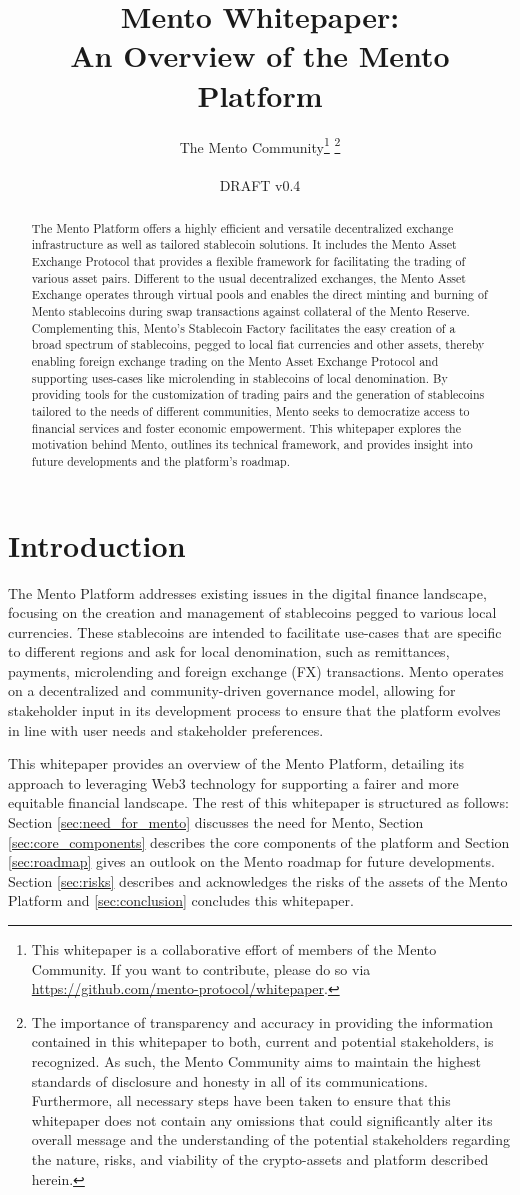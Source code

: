 \documentclass[a4paper]{article}
\title{Mento Whitepaper: \\ An Overview of the Mento Platform}
\date{The Mento Community\thanks{This whitepaper is a collaborative effort of members of the Mento Community. If you want to contribute, please do so via \url{https://github.com/mento-protocol/whitepaper}.} \thanks{The importance of transparency and accuracy in providing the information contained in this whitepaper to both, current and potential stakeholders, is recognized. As such, the Mento Community aims to maintain the highest standards of disclosure and honesty in all of its communications. Furthermore, all necessary steps have been taken to ensure that this whitepaper does not contain any omissions that could significantly alter its overall message and the understanding of the potential stakeholders regarding the nature, risks, and viability of the crypto-assets and platform described herein.} \\\quad\\ DRAFT  v0.4}
\theoremstyle{definition}
\begin{document}
\maketitle

\begin{abstract}
The Mento Platform offers a highly efficient and versatile decentralized exchange infrastructure as well as tailored stablecoin solutions. It includes the Mento Asset Exchange Protocol that provides a flexible framework for facilitating the trading of various asset pairs. Different to the usual decentralized exchanges, the Mento Asset Exchange operates through virtual pools and enables the direct minting and burning of Mento stablecoins during swap transactions against collateral of the Mento Reserve. Complementing this, Mento's Stablecoin Factory facilitates the easy creation of a broad spectrum of stablecoins, pegged to local fiat currencies and other assets, thereby enabling foreign exchange trading on the Mento Asset Exchange Protocol and supporting uses-cases like microlending in stablecoins of local denomination. By providing tools for the customization of trading pairs and the generation of stablecoins tailored to the needs of different communities, Mento seeks to democratize access to financial services and foster economic empowerment. This whitepaper explores the motivation behind Mento, outlines its technical framework, and provides insight into future developments and the platform’s roadmap.
\end{abstract}

\newpage
\tableofcontents

\newpage

\section{Introduction}
\label{sec:introduction}
The Mento Platform addresses existing issues in the digital finance landscape, focusing on the creation and management of stablecoins pegged to various local currencies. These stablecoins are intended to facilitate use-cases that are specific to different regions and ask for local denomination, such as remittances, payments, microlending and foreign exchange (FX) transactions. Mento operates on a decentralized and community-driven governance model, allowing for stakeholder input in its development process to ensure that the platform evolves in line with user needs and stakeholder preferences.

This whitepaper provides an overview of the Mento Platform, detailing its approach to leveraging Web3 technology for supporting a fairer and more equitable financial landscape. The rest of this whitepaper is structured as follows: Section \ref{sec:need_for_mento} discusses the need for Mento, Section \ref{sec:core_components} describes the core components of the platform and Section \ref{sec:roadmap} gives an outlook on the Mento roadmap for future developments. Section \ref{sec:risks} describes and acknowledges the risks of the assets of the Mento Platform and \ref{sec:conclusion} concludes this whitepaper.
\end{document}

